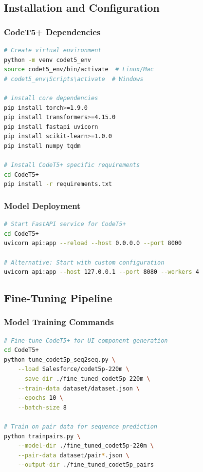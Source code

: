 \documentclass[12pt,a4paper]{article}
\begin{document}
\subsection{Installation and Configuration}

\subsubsection{CodeT5+ Dependencies}

\begin{lstlisting}[caption=Environment Setup Commands, language=bash]
# Create virtual environment
python -m venv codet5_env
source codet5_env/bin/activate  # Linux/Mac
# codet5_env\Scripts\activate  # Windows

# Install core dependencies
pip install torch>=1.9.0
pip install transformers>=4.15.0
pip install fastapi uvicorn
pip install scikit-learn>=1.0.0
pip install numpy tqdm

# Install CodeT5+ specific requirements
cd CodeT5+
pip install -r requirements.txt
\end{lstlisting}

\subsubsection{Model Deployment}

\begin{lstlisting}[caption=Model Service Startup, language=bash]
# Start FastAPI service for CodeT5+
cd CodeT5+
uvicorn api:app --reload --host 0.0.0.0 --port 8000

# Alternative: Start with custom configuration
uvicorn api:app --host 127.0.0.1 --port 8080 --workers 4
\end{lstlisting}

\subsection{Fine-Tuning Pipeline}

\subsubsection{Model Training Commands}

\begin{lstlisting}[caption=Fine-Tuning Execution, language=bash]
# Fine-tune CodeT5+ for UI component generation
cd CodeT5+
python tune_codet5p_seq2seq.py \
    --load Salesforce/codet5p-220m \
    --save-dir ./fine_tuned_codet5p-220m \
    --train-data dataset/dataset.json \
    --epochs 10 \
    --batch-size 8

# Train on pair data for sequence prediction
python trainpairs.py \
    --model-dir ./fine_tuned_codet5p-220m \
    --pair-data dataset/pair*.json \
    --output-dir ./fine_tuned_codet5p_pairs
\end{lstlisting}
\end{document}
